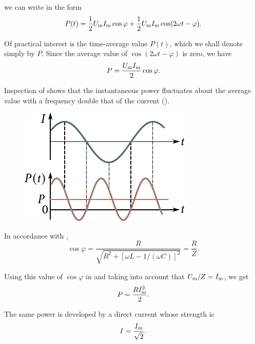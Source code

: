 \noindent
we can write  in the form
\begin{equation}\label{eq:13_57}
    P(t) = \frac{1}{2} U_{\text{m}} I_{\text{m}} \cos\varphi + \frac{1}{2} U_{\text{m}} I_{\text{m}} \cos(2\omega t - \varphi).
\end{equation}

Of practical interest is the time-average value $P(t)$, which we shall denote simply by $P$.
Since the average value of $\cos(2\omega t - \varphi)$ is zero, we have
\begin{equation}\label{eq:13_58}
    P = \frac{U_{\text{m}} I_{\text{m}}}{2} \cos\varphi.
\end{equation}

\noindent
Inspection of  shows that the instantaneous power fluctuates about the average value with a frequency double that of the current ().

\begin{figure}[t]
	\begin{center}
		\includegraphics[scale=1]{figures/ch_13/fig_13_10.pdf}
		\caption[]{}
		\label{fig:13_10}
	\end{center}
	\vspace{-0.8cm}
\end{figure}

In accordance with ,
\begin{equation}\label{eq:13_59}
    \cos\varphi = \frac{R}{\sqrt{R^2+[\omega L - 1/(\omega C)]^2}} = \frac{R}{Z}.
\end{equation}

\noindent
Using this value of $\cos\varphi$ in  and taking into account that $U_{\text{m}}/Z=I_{\text{m}}$, we get
\begin{equation}\label{eq:13_60}
    P = \frac{RI_{\text{m}}^2}{2}.
\end{equation}

\noindent
The same power is developed by a direct current whose strength is
\begin{equation}\label{eq:13_61}
    I = \frac{I_{\text{m}}}{\sqrt{2}}.
\end{equation}

